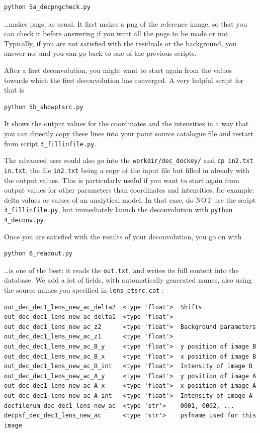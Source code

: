 \begin{Verbatim}
python 5a_decpngcheck.py
\end{Verbatim}
\ldots makes pngs, as usual. It first makes a png of the reference image, so that you can check it before answering if you want all the pngs to be made or not. Typically, if you are not satisfied with the residuals or the background, you answer no, and you can go back to one of the previous scripts. 

After a first deconvolution, you might want to start again from the values towards which the first deconvolution has converged. A very helpful script for that is

\begin{Verbatim}
python 5b_showptsrc.py
\end{Verbatim}
It shows the output values for the coordinates and the intensities in a way that you can directly copy these lines into your point source catalogue file and restart from script \verb+3_fillinfile.py+.

The advanced user could also go into the \verb+workdir/dec_deckey/+ and \verb+cp in2.txt in.txt+, the file \verb+in2.txt+ being a copy of the input file but filled in already with the output values. This is particularly useful if you want to start again from output values for other parameters than coordinates and intensities, for example: delta values or values of an analytical model. In that case, do NOT use the script \verb+3_fillinfile.py+, but immediately launch the deconvolution with \verb+python 4_deconv.py+.

Once you are satisfied with the results of your deconvolution, you go on with

\begin{Verbatim}
python 6_readout.py
\end{Verbatim}

\ldots is one of the best: it reads the \verb+out.txt+, and writes its full content into the database. We add a lot of fields, with automatically generated names, also using the source names you specified in \verb+lens_ptsrc.cat+ :

\begin{Verbatim}[fontsize=\relsize{-2}]
out_dec_dec1_lens_new_ac_delta2  <type 'float'>  Shifts
out_dec_dec1_lens_new_ac_delta1  <type 'float'>  
out_dec_dec1_lens_new_ac_z2      <type 'float'>  Background parameters
out_dec_dec1_lens_new_ac_z1      <type 'float'>
out_dec_dec1_lens_new_ac_B_y     <type 'float'>  y position of image B
out_dec_dec1_lens_new_ac_B_x     <type 'float'>  x position of image B
out_dec_dec1_lens_new_ac_B_int   <type 'float'>  Intensity of image B
out_dec_dec1_lens_new_ac_A_y     <type 'float'>  y position of image A
out_dec_dec1_lens_new_ac_A_x     <type 'float'>  x position of image A
out_dec_dec1_lens_new_ac_A_int   <type 'float'>  Intensity of image A
decfilenum_dec_dec1_lens_new_ac  <type 'str'>    0001, 0002, ...
decpsf_dec_dec1_lens_new_ac      <type 'str'>    psfname used for this image
\end{Verbatim}

